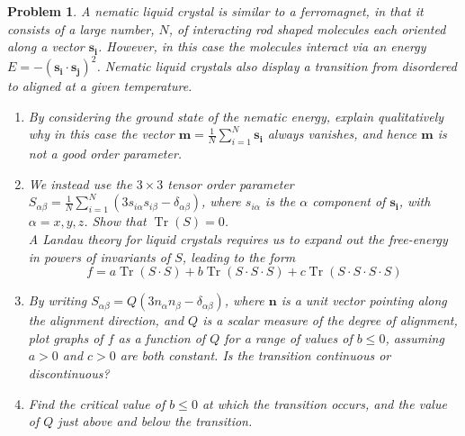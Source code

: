 \documentclass[a4paper]{article}
\DeclareMathOperator{\Tr}{Tr}
\theoremstyle{new}
\newtheorem{qns}{Problem}[section]
\begin{document}
\begin{qns}
A nematic liquid crystal is similar to a ferromagnet, in that it consists of a large number, $N$, of interacting rod shaped molecules each oriented along a vector $\mathbf{s_i}$. However,
in this case the molecules interact via an energy $E=-(\mathbf{s_i}\cdot\mathbf{s_j})^2$. Nematic liquid crystals also display a transition from disordered to aligned at a given temperature.
\begin{enumerate}[label=(\alph*)]
\item  By considering the ground state of the nematic energy, explain qualitatively why in this case the vector $\mathbf{m}=\frac{1}{N}\sum_{i=1}^N\mathbf{s_i}$ always vanishes, and hence $\mathbf{m}$ is not a good order parameter.
\item We instead use the $3\times 3$ tensor order parameter $S_{\alpha\beta}=\frac{1}{N}\sum_{i=1}^N(3s_{i\alpha}s_{i\beta}-\delta_{\alpha\beta})$, where $s_{i\alpha}$ is the $\alpha$ component of $\mathbf{s_i}$, with $\alpha=x,y,z$. Show that $\Tr(S)=0$.\\[5pt]
A Landau theory for liquid crystals requires us to expand out the free-energy in powers of invariants of $S$, leading to the form
$$f=a\Tr(S\cdot S)+b\Tr(S\cdot S\cdot S)+c\Tr(S\cdot S\cdot S\cdot S)$$
\item By writing $S_{\alpha\beta}=Q(3n_\alpha n_\beta-\delta_{\alpha\beta})$, where $\mathbf{n}$ is a unit vector pointing along the alignment direction, and $Q$ is a scalar measure of the degree of alignment, plot graphs of $f$ as a function of $Q$ for a range of values of $b\leq 0$, assuming $a > 0$ and $c > 0$ are both constant. Is the transition continuous or discontinuous?
\item Find the critical value of $b\leq 0$ at which the transition occurs, and the value of $Q$ just above and below the transition.
\end{enumerate}
\end{qns}
\end{document}
